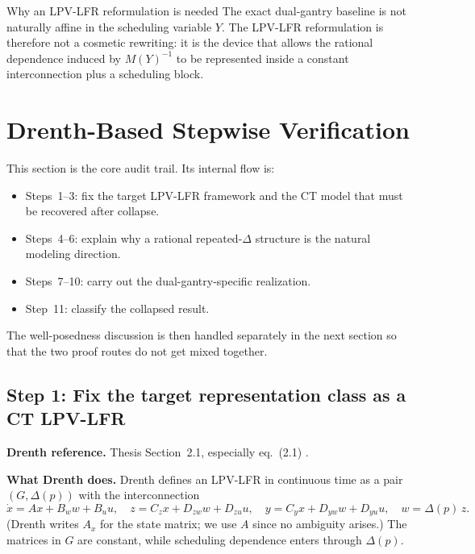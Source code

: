 ﻿\documentclass[11pt]{article}
\newcommand{\audititem}[2]{\par\smallskip\noindent\textbf{#1.} #2\par}
\begin{document}
\begin{resultbox}{Why an LPV-LFR reformulation is needed}
The exact dual-gantry baseline is not naturally affine in the scheduling
variable $Y$. The LPV-LFR reformulation is therefore not a cosmetic rewriting:
it is the device that allows the rational dependence induced by
$M(Y)^{-1}$ to be represented inside a constant interconnection plus a
scheduling block.
\end{resultbox}

\section{Drenth-Based Stepwise Verification}

This section is the core audit trail. Its internal flow is:
\begin{itemize}[leftmargin=1.2em]
    \item Steps~1--3: fix the target LPV-LFR framework and the CT model that
    must be recovered after collapse.
    \item Steps~4--6: explain why a rational repeated-$\Delta$ structure is the
    natural modeling direction.
    \item Steps~7--10: carry out the dual-gantry-specific realization.
    \item Step~11: classify the collapsed result.
\end{itemize}
The well-posedness discussion is then handled separately in the next section so
that the two proof routes do not get mixed together.

\subsection{Step 1: Fix the target representation class as a CT LPV-LFR}

\audititem{Drenth reference}{Thesis Section~2.1, especially eq.~(2.1)
\cite{drenth2025thesis}.}

\audititem{What Drenth does}{Drenth defines an LPV-LFR in continuous time as a
pair $(G,\Delta(p))$ with the interconnection
\[
\dot{x} = A x + B_w w + B_u u,\quad
z = C_z x + D_{zw} w + D_{zu} u,\quad
y = C_y x + D_{yw} w + D_{yu} u,\quad
w = \Delta(p)\,z.
\]
(Drenth writes $A_x$ for the state matrix; we use $A$ since no ambiguity arises.)
The matrices in $G$ are constant, while scheduling dependence enters through
$\Delta(p)$.}
\end{document}
